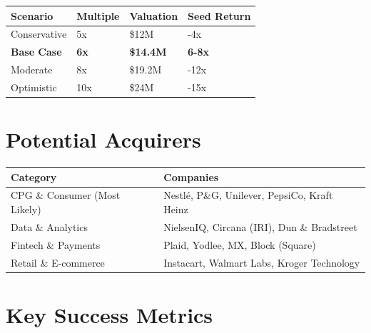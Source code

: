 \documentclass[11pt,a4paper]{report}
\begin{document}
\begin{center}
\renewcommand{\arraystretch}{1.4}
\begin{tabular}{>{\raggedright\arraybackslash}p{3cm} >{\centering\arraybackslash}p{2cm} >{\centering\arraybackslash}p{3cm} >{\centering\arraybackslash}p{3cm}}
\toprule
\rowcolor{miloprimary!15}
\textbf{Scenario} & \textbf{Multiple} & \textbf{Valuation} & \textbf{Seed Return} \\
\midrule
\rowcolor{dangerred!10}
Conservative & 5x & \$12M & 3-4x \\
\rowcolor{lightbg}
\textbf{Base Case} & \textbf{6x} & \textbf{\$14.4M} & \textbf{6-8x} \\
Moderate & 8x & \$19.2M & 10-12x \\
\rowcolor{successgreen!10}
Optimistic & 10x & \$24M & 12-15x \\
\bottomrule
\end{tabular}
\end{center}

\section{Potential Acquirers}

\begin{center}
\renewcommand{\arraystretch}{1.4}
\begin{tabular}{>{\raggedright\arraybackslash}p{4cm} >{\raggedright\arraybackslash}p{8cm}}
\toprule
\rowcolor{miloprimary!15}
\textbf{Category} & \textbf{Companies} \\
\midrule
CPG \& Consumer (Most Likely) & Nestl\'{e}, P\&G, Unilever, PepsiCo, Kraft Heinz \\
\rowcolor{lightbg}
Data \& Analytics & NielsenIQ, Circana (IRI), Dun \& Bradstreet \\
Fintech \& Payments & Plaid, Yodlee, MX, Block (Square) \\
\rowcolor{lightbg}
Retail \& E-commerce & Instacart, Walmart Labs, Kroger Technology \\
\bottomrule
\end{tabular}
\end{center}

\section{Key Success Metrics}
\end{document}
